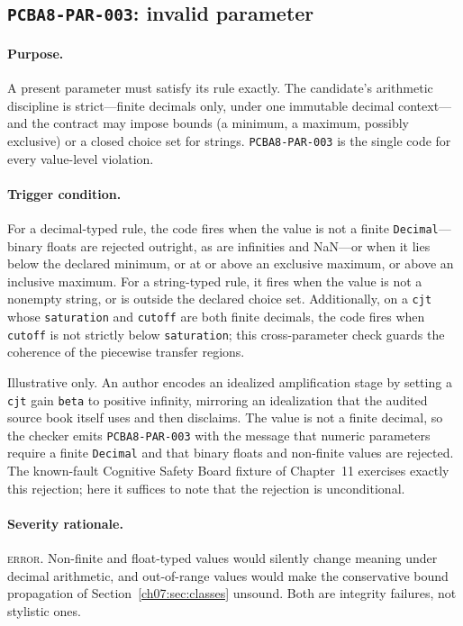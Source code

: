 \subsection{\texttt{PCBA8-PAR-003}: invalid parameter}\label{ch07:sub:par003}

\paragraph{Purpose.} A present parameter must satisfy its rule exactly. The candidate's arithmetic discipline is strict---finite decimals only, under one immutable decimal context---and the contract may impose bounds (a minimum, a maximum, possibly exclusive) or a closed choice set for strings. \texttt{PCBA8-PAR-003} is the single code for every value-level violation.

\paragraph{Trigger condition.} For a decimal-typed rule, the code fires when the value is not a finite \texttt{Decimal}---binary floats are rejected outright, as are infinities and NaN---or when it lies below the declared minimum, or at or above an exclusive maximum, or above an inclusive maximum. For a string-typed rule, it fires when the value is not a nonempty string, or is outside the declared choice set. Additionally, on a \texttt{cjt} whose \texttt{saturation} and \texttt{cutoff} are both finite decimals, the code fires when \texttt{cutoff} is not strictly below \texttt{saturation}; this cross-parameter check guards the coherence of the piecewise transfer regions.

\begin{example}\label{ch07:ex:par003}
Illustrative only. An author encodes an idealized amplification stage by setting a \texttt{cjt} gain \texttt{beta} to positive infinity, mirroring an idealization that the audited source book itself uses and then disclaims. The value is not a finite decimal, so the checker emits \texttt{PCBA8-PAR-003} with the message that numeric parameters require a finite \texttt{Decimal} and that binary floats and non-finite values are rejected. The known-fault Cognitive Safety Board fixture of Chapter~11 exercises exactly this rejection; here it suffices to note that the rejection is unconditional.
\end{example}

\paragraph{Severity rationale.} \textsc{error}. Non-finite and float-typed values would silently change meaning under decimal arithmetic, and out-of-range values would make the conservative bound propagation of Section~\ref{ch07:sec:classes} unsound. Both are integrity failures, not stylistic ones.

